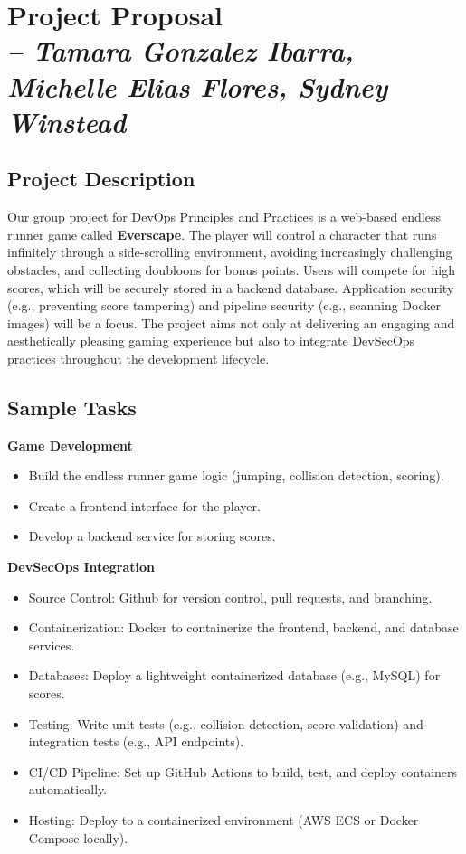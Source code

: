 \chapter{Project Proposal \\
\small{\textit{-- Tamara Gonzalez Ibarra, Michelle Elias Flores, Sydney Winstead}}
\label{Chapter::itProjectProposal}}

\section{Project Description}
Our group project for DevOps Principles and Practices is a web-based endless runner game called \textbf{Everscape}. The player will control a character that runs infinitely through a side-scrolling environment, avoiding increasingly challenging obstacles, and collecting doubloons for bonus points. Users will compete for high scores, which will be securely stored in a backend database. Application security (e.g., preventing score tampering) and pipeline security (e.g., scanning Docker images) will be a focus.
The project aims not only at delivering an engaging and aesthetically pleasing gaming experience but also to integrate DevSecOps practices throughout the development lifecycle. 

\section{Sample Tasks}
\textbf{Game Development}
\begin{itemize}
    \item Build the endless runner game logic (jumping, collision detection, scoring).
    \item Create a frontend interface for the player.
    \item Develop a backend service for storing scores.
\end{itemize}
\textbf{DevSecOps Integration}
\begin{itemize}
    \item Source Control: Github for version control, pull requests, and branching.
    \item Containerization: Docker to containerize the frontend, backend, and database services.
    \item Databases: Deploy a lightweight containerized database (e.g., MySQL) for  scores.
    \item Testing: Write unit tests (e.g., collision detection, score validation) and integration tests (e.g., API endpoints).
    \item CI/CD Pipeline: Set up GitHub Actions to build, test, and deploy containers automatically.
    \item Hosting: Deploy to a containerized environment (AWS ECS or Docker Compose locally).
\end{itemize}

